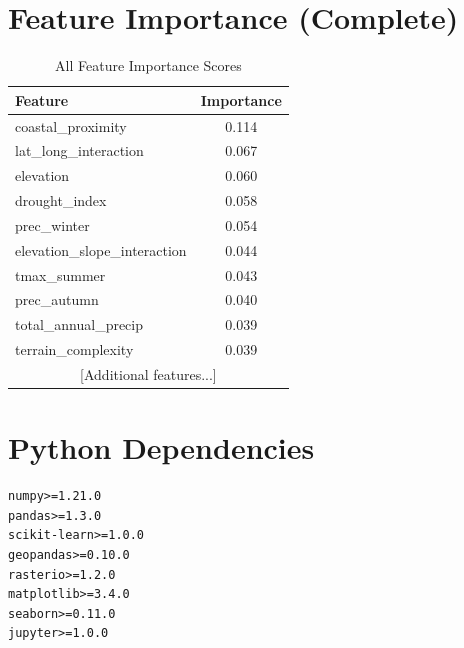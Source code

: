\section*{Feature Importance (Complete)}
\begin{table}[H]
\centering
\caption{All Feature Importance Scores}
\begin{tabular}{|l|c|}
\hline
\textbf{Feature} & \textbf{Importance} \\
\hline
coastal\_proximity & 0.114 \\
lat\_long\_interaction & 0.067 \\
elevation & 0.060 \\
drought\_index & 0.058 \\
prec\_winter & 0.054 \\
elevation\_slope\_interaction & 0.044 \\
tmax\_summer & 0.043 \\
prec\_autumn & 0.040 \\
total\_annual\_precip & 0.039 \\
terrain\_complexity & 0.039 \\
\hline
\multicolumn{2}{|c|}{[Additional features...]} \\
\hline
\end{tabular}
\end{table}

\section*{Python Dependencies}
\begin{verbatim}
numpy>=1.21.0
pandas>=1.3.0
scikit-learn>=1.0.0
geopandas>=0.10.0
rasterio>=1.2.0
matplotlib>=3.4.0
seaborn>=0.11.0
jupyter>=1.0.0
\end{verbatim}
